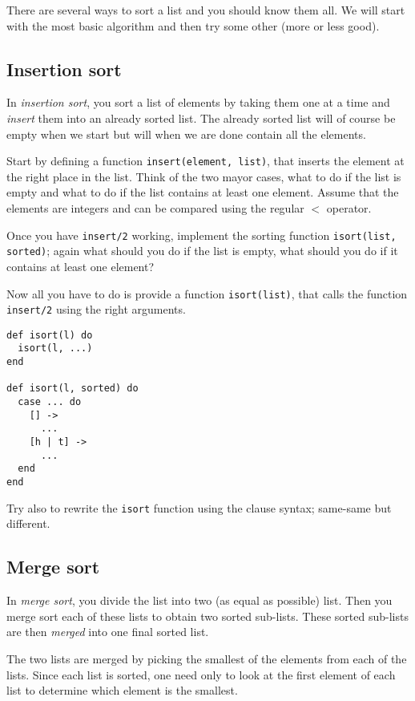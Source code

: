 \documentclass[a4paper,11pt]{article}
\begin{document}
There are several ways to sort a list and you should know them all. We
will start with the most basic algorithm and then try some other (more or less good).


\subsection{Insertion sort}

In {\em insertion sort}, you sort a list of elements by taking them
one at a time and {\em insert} them into an already sorted list. The
already sorted list will of course be empty when we start but will
when we are done contain all the elements.

Start by defining a function {\tt insert(element, list)}, that inserts
the element at the right place in the list. Think of the two mayor
cases, what to do if the list is empty and what to do if the list
contains at least one element. Assume that the elements are integers
and can be compared using the regular $<$ operator.

Once you have {\tt insert/2} working, implement the sorting function
{\tt isort(list, sorted)}; again what should you do if the list is
empty, what should you do if it contains at least one element?

Now all you have to do is provide a function {\tt isort(list)}, that
calls the function {\tt insert/2} using the right arguments.

\begin{verbatim}
def isort(l) do 
  isort(l, ...)
end

def isort(l, sorted) do
  case ... do
    [] -> 
      ...
    [h | t] ->
      ...
  end
end
\end{verbatim}

Try also to rewrite the {\tt isort} function using the clause syntax;
same-same but different.

\subsection{Merge sort}

In {\em merge sort}, you divide the list into two (as equal as
possible) list. Then you merge sort each of these lists to obtain two
sorted sub-lists. These sorted sub-lists are then {\em merged} into
one final sorted list. 

The two lists are merged by picking the smallest of the elements from
each of the lists. Since each list is sorted, one need only to look at
the first element of each list to determine which element is the
smallest.
\end{document}
